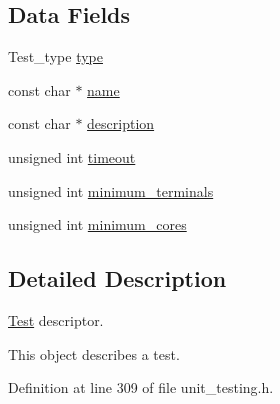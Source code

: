 \subsection*{Data Fields}
\begin{DoxyCompactItemize}
\item 
Test\-\_\-type \hyperlink{structTest_a5074007b777ea0958966027197c17792}{type}
\item 
const char $\ast$ \hyperlink{structTest_ae44674e48b203d9c26e04e09b6fe5b61}{name}
\item 
\begin{tabbing}
xx\=xx\=xx\=xx\=xx\=xx\=xx\=xx\=xx\=\kill
union \{\\
\hypertarget{unionTest_1_1@2_a78f4e45a096909353d889b7d5789f50f}{\>void($\ast$ {\bfseries bare} )(void)\\
\hypertarget{unionTest_1_1@2_a3297349c99c67c41ba71d8d81f4149dd}{\>\hyperlink{group__syscalls_ga0c7678964128d7fccc9ce98528494f4a}{Task} {\bfseries boot}\\
\hypertarget{unionTest_1_1@2_a2a351f3e920d8000280ba41d811c0f19}{\>const struct \hyperlink{structTest}{Test} $\ast$$\ast$ {\bfseries suite}\\
\}; \\

\end{tabbing}\item 
const char $\ast$ \hyperlink{structTest_a294ca3f1114240c908f66216afcad783}{description}
\item 
unsigned int \hyperlink{structTest_a80e78f2e6aeed2a6e5b7c705ce5a1493}{timeout}
\item 
unsigned int \hyperlink{structTest_a2741188633c51b8e3cb545fa3971bf60}{minimum\-\_\-terminals}
\item 
unsigned int \hyperlink{structTest_ac203918837b4c6718a020246e189a95a}{minimum\-\_\-cores}
\end{DoxyCompactItemize}


\subsection{Detailed Description}
\hyperlink{structTest}{Test} descriptor. 

This object describes a test. 

Definition at line 309 of file unit\-\_\-testing.\-h.



